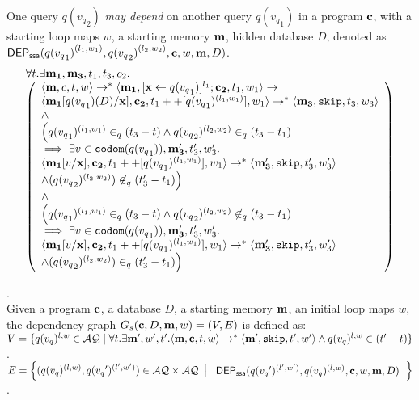 \begin{defn}
One query ${q({v_q}_2)}$ \emph{may depend} on another query ${q({v_q}_1)}$ in a program ${\bf{{c}}}$,  with a starting loop maps $w$, a starting memory ${\bf{{m}}}$, hidden database $D$, denoted as \\
 $\mathsf{DEP_{ssa}}({q({v_q}_1)}^{(l_1, w_1)}, {q({v_q}_2)}^{(l_2, w_2)}, {\bf{{c}}},w, {\bf{{m}}},D)$.
 \[
\begin{array}{l}
\forall  t. \exists {\bf{{m_1}}},{\bf{{m_3}}},t_1,t_3,c_2.\\
  \left (\begin{array}{l}   
\langle {\bf{{m}}}, c,  t,w \rangle \rightarrow^{*} \langle {\bf{{m_1}}}, [\mathrel{ {\bf{{x}}} \leftarrow q({v_q}_1) }]^{l_1} ; {\bf{{c_2}}},
  t_1,w_1 \rangle \rightarrow \\ \langle {\bf{{m_1}}}[q({v_q}_1)(D)/{\bf{{x}}}], {\bf{{c_2}}},
  t_1++[q({v_q}_1)^{(l_1, w_1)}], w_1 \rangle \rightarrow^{*} \langle {\bf{{m_3}}}, \mathtt{skip},
  t_3,w_3 \rangle \\  
  \land \\
\Big( q({v_q}_1)^{(l_1,w_1)} \in_{q} (t_3-t) \land q({v_q}_2)^{(l_2,w_2)} \in_{q} (t_3-t_1) \\ \implies  \exists v \in \mathtt{codom}(q({v_q}_1)), {\bf{{m_3'}}}, t_3', w_3'.  \\
 \langle {\bf{{m_1}}}[v/{\bf{{x}}}], {\bf{{c_2}}}, t_1++[q({v_q}_1)^{(l_1,w_1)}], w_1 \rangle \rightarrow^{*} \langle {\bf{{m_3'}}}, \mathtt{skip}, t_3', w_3' \rangle \\ \land (q({v_q}_2)^{(l_2,w_2)}) \not \in_{q} (t_3'-t_1)
\Big)\\
\land \\
\Big(q({v_q}_1)^{(l_1,w_1)} \in_{q} (t_3-t) \land q({v_q}_2)^{(l_2,w_2)} \not\in_{q} (t_3-t_1) \\ \implies  \exists v \in \mathtt{codom}(q({v_q}_1)),  {\bf{{m_3'}}}, t_3', w_3'. \\
 \langle {\bf{{m_1}}}[v/{\bf{{x}}}], {\bf{{c_2}}}, t_1++[q({v_q}_1)^{(l_1,w_1)}], w_1 \rangle \rightarrow^{*} \langle {\bf{{m_3'}}}, \mathtt{skip}, t_3', w_3' \rangle \\ \land (q({v_q}_2)^{(l_2,w_2)})  \in_{q} (t_3'-t_1)
\Big)
\end{array} \right )
\end{array}
\]
\end{defn}


\begin{defn}
.
\\
Given a program ${\bf{{c}}}$, a database $D$, a starting memory ${\bf{{m}}}$, an initial loop maps $w$, the dependency graph $G_{s}({\bf{{c}}},D,{\bf{{m}}},w) = (V, E)$ is defined as: \\
$V =\{q({v_q})^{l,w} \in \mathcal{AQ} \mid \forall t. \exists {\bf{{m'}}},  w', t'.  \langle {\bf{{m}}} ,{\bf{{c}}}, t, w \rangle  \to^{*}  \langle {\bf{{m'}}} , \mathtt{skip}, t', w'  \rangle  \land q({v_q})^{l,w} \in {(t'-t)}  \}$.
\\
$E = \left\{(q({v_q})^{(l,w)},q({v_q}')^{(l',w')}) \in \mathcal{AQ} \times \mathcal{AQ} 
~ \left \vert ~ \begin{array}{l}
  \mathsf{DEP_{ssa}}(q({v_q}')^{(l',w')},q({v_q})^{(l,w)}, {\bf{{c}}},w,{\bf{{m}}},D)     
\end{array} \right. 
\right\}$.
\end{defn}


